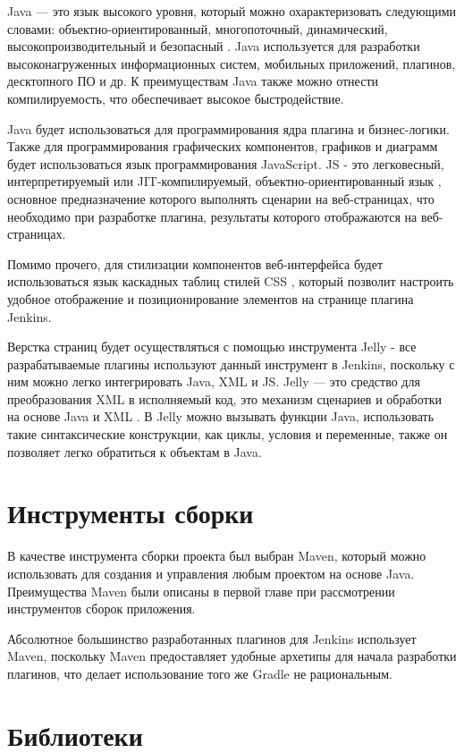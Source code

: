 Java — это язык высокого уровня, который можно охарактеризовать следующими словами: объектно-ориентированный, многопоточный, динамический, высокопроизводительный и безопасный \cite{java}. Java используется для разработки высоконагруженных информационных систем, мобильных приложений, плагинов, десктопного ПО и др. К преимуществам Java также можно отнести компилируемость, что обеспечивает высокое быстродействие.

Java будет использоваться для программирования ядра плагина и бизнес-логики. Также для программирования графических компонентов, графиков и диаграмм будет использоваться язык программирования JavaScript. JS - это легковесный, интерпретируемый или JIT-компилируемый, объектно-ориентированный язык \cite{js}, основное предназначение которого выполнять сценарии на веб-страницах, что необходимо при разработке плагина, результаты которого отображаются на веб-страницах.

Помимо прочего, для стилизации компонентов веб-интерфейса будет использоваться язык каскадных таблиц стилей CSS \cite{css}, который позволит настроить удобное отображение и позиционирование элементов на странице плагина Jenkins. 

Верстка страниц будет осуществляться с помощью инструмента Jelly - все разрабатываемые плагины используют данный инструмент в Jenkins, поскольку с ним можно легко интегрировать Java, XML и JS. Jelly — это средство для преобразования XML в исполняемый код, это механизм сценариев и обработки на основе Java и XML \cite{jelly}. В Jelly можно вызывать функции Java, использовать такие синтаксические конструкции, как циклы, условия и переменные, также он позволяет легко обратиться к объектам в Java.

\section{Инструменты сборки} \label{ch1:sec5}

В качестве инструмента сборки проекта был выбран Maven, который можно использовать для создания и управления любым проектом на основе Java. Преимущества Maven были описаны в первой главе при рассмотрении инструментов сборок приложения.

Абсолютное большинство разработанных плагинов для Jenkins использует Maven, поскольку Maven предоставляет удобные архетипы для начала разработки плагинов, что делает использование того же Gradle не рациональным.


\section{Библиотеки} \label{ch1:sec6}

